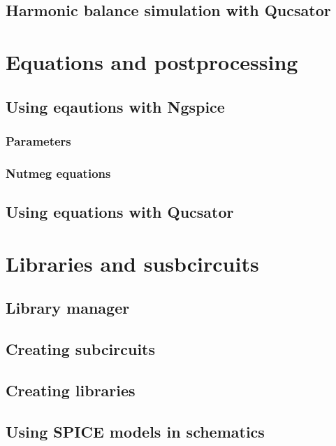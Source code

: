 \documentclass[a4paper,12pt]{article}
\begin{document}
\subsection{Harmonic balance simulation with Qucsator}

\section{Equations and postprocessing}

\subsection{Using eqautions with Ngspice}

\subsubsection{Parameters}

\subsubsection{Nutmeg equations}

\subsection{Using equations with Qucsator}

\section{Libraries and susbcircuits}

\subsection{Library manager}

\subsection{Creating subcircuits}

\subsection{Creating libraries}

\subsection{Using SPICE models in schematics}
\end{document}
